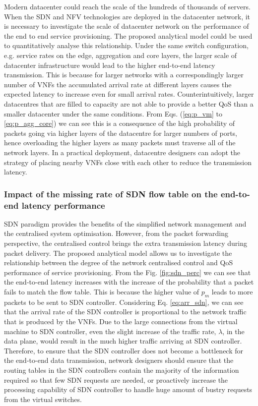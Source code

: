 Modern datacenter could reach the scale of the hundreds of thousands of servers. When the SDN and NFV technologies are deployed in the datacenter network, it is necessary to investigate the scale of datacenter network on the performance of the end to end service provisioning.  The proposed analytical model could be used to quantitatively analyse this relationship. Under the same switch configuration, e.g. service rates on the edge, aggregation and core layers, the larger scale of datacenter infrastructure would lead to the higher end-to-end latency transmission. This is because for larger networks with a correspondingly larger number of VNFs the accumulated arrival rate at different layers causes the expected latency to increase even for small arrival rates. Counterintuitively, larger datacentres that are filled to capacity are not able to provide a better QoS than a smaller datacenter under the same conditions. From Eqs. (\ref{eq:p_vm} to \ref{eq:p_agg_core}) we can see this is a consequence of the high probability of packets going via higher layers of the datacentre for larger numbers of ports, hence overloading the higher layers as many packets must traverse all of the network layers. In a practical deployment, datacentre designers can adopt the strategy of placing nearby VNFs close with each other to reduce the transmission latency.

\subsubsection{Impact of the missing rate of SDN flow table on the end-to-end latency performance}

SDN paradigm provides the benefits of the simplified network management and the centralised system optimisation. However, from the packet forwarding perspective, the centralised control brings the extra transmission latency during packet delivery. The proposed analytical model allows us to investigate the relationship between the degree of the network centralised control and QoS performance of service provisioning. From the Fig. \ref{fig:sdn_perc} we can see that the end-to-end latency increases with the increase of the probability that a packet fails to match the flow table. This is because the higher value of $p_m$ leads to more packets to be sent to SDN controller. Considering Eq. \ref{eq:arr_sdn}, we can see that the arrival rate of the SDN controller is proportional to the network traffic that is produced by the VNFs. Due to the large connections from the virtual machine to SDN controller, even the slight increase of the traffic rate, $\lambda$, in the data plane, would result in the much higher traffic arriving at SDN controller. Therefore, to ensure that the SDN controller does not become a bottleneck for the end-to-end data transmission, network designers should ensure that the routing tables in the SDN controllers contain the majority of the information required so that few SDN requests are needed, or proactively increase the processing capability of SDN controller to handle huge amount of bustry requests from the virtual switches.